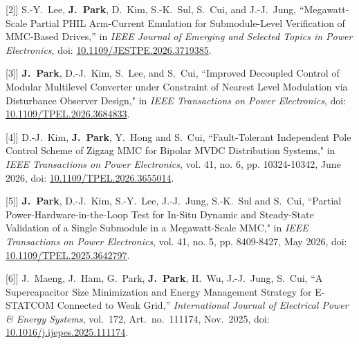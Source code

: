 \documentclass[letterpaper,10pt]{article}
\newlength{\publicationNumberWidth}
\newcommand{\publicationNumberLabel}[1]{\makebox[\publicationNumberWidth][l]{\small [#1]}}
\begin{document}
    \item[\publicationNumberLabel{2}]\small{
    S.-Y.~Lee, \textbf{J.~Park}, D.~Kim, S.-K.~Sul, S.~Cui, and J.-J.~Jung,
    ``Megawatt-Scale Partial PHIL Arm-Current Emulation for Submodule-Level
    Verification of MMC-Based Drives,''
    in \textit{IEEE Journal of Emerging and Selected Topics in Power Electronics},
    doi: \href{https://ieeexplore.ieee.org/document/11639610}{10.1109/JESTPE.2026.3719385}.
    }\vspace{-2pt}

    \item[\publicationNumberLabel{3}]\small{
    \textbf{J.~Park}, D.-J.~Kim, S.~Lee, and S.~Cui,
    ``Improved Decoupled Control of Modular Multilevel Converter under
    Constraint of Nearest Level Modulation via Disturbance Observer Design,"
    in \textit{IEEE Transactions on Power Electronics}, doi: \href{https://ieeexplore.ieee.org/document/11482551}{10.1109/TPEL.2026.3684833}.
    }\vspace{-2pt}

    \item[\publicationNumberLabel{4}]\small{
      D.-J.~Kim, \textbf{J.~Park}, Y.~Hong and S.~Cui,
      ``Fault-Tolerant Independent Pole Control Scheme of Zigzag MMC for
      Bipolar MVDC Distribution Systems," in \textit{IEEE Transactions on Power Electronics}, vol. 41, no. 6, pp. 10324-10342, June 2026,
      doi: \href{https://ieeexplore.ieee.org/document/11355813}{10.1109/TPEL.2026.3655014}.
    }\vspace{-2pt}


    \item[\publicationNumberLabel{5}]\small{
    \textbf{J.~Park}, D.-J.~Kim, S.-Y.~Lee, J.-J.~Jung, S.-K.~Sul and S.~Cui,
    ``Partial Power-Hardware-in-the-Loop Test for In-Situ Dynamic and
    Steady-State Validation of a Single Submodule in a Megawatt-Scale MMC,"
    in \textit{IEEE Transactions on Power Electronics}, vol. 41, no. 5, pp. 8409-8427, May 2026,
    doi: \href{https://ieeexplore.ieee.org/document/11297165}{10.1109/TPEL.2025.3642797}.
    }\vspace{-2pt}

    \item[\publicationNumberLabel{6}]\small{
      J.~Maeng, J.~Ham, G.~Park, \textbf{J.~Park}, H.~Wu, J.-J.~Jung, S.~Cui,
      ``A Supercapacitor Size Minimization and Energy Management Strategy for E-STATCOM
      Connected to Weak Grid,''
      \textit{International Journal of Electrical Power \& Energy Systems}, vol.~172, Art.~no.~111174, Nov.~2025,
      doi: \href{https://www.sciencedirect.com/science/article/pii/S0142061525007227}{10.1016/j.ijepes.2025.111174}.
    }\vspace{-2pt}
\end{document}

